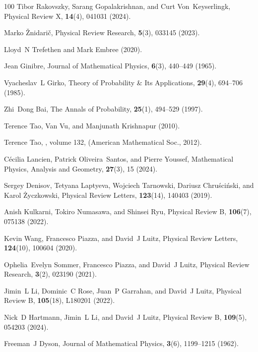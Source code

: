 \documentclass[preprint,pteplogo]{ptephy_v2}%
\numberwithin{equation}{section}
\theoremstyle{definition}
\begin{document}
\begin{thebibliography}{100}
Tibor Rakovszky, Sarang Gopalakrishnan, and Curt Von~Keyserlingk, Physical Review X, {\bf 14}(4), 041031 (2024).

Marko {\v{Z}}nidari{\v{c}}, Physical Review Research, {\bf 5}(3), 033145 (2023).

Lloyd~N Trefethen and Mark Embree (2020).

Jean Ginibre, Journal of Mathematical Physics, {\bf 6}(3), 440--449 (1965).

Vyacheslav~L Girko, Theory of Probability \& Its Applications, {\bf 29}(4), 694--706 (1985).

Zhi~Dong Bai, The Annals of Probability, {\bf 25}(1), 494--529 (1997).

Terence Tao, Van Vu, and Manjunath Krishnapur (2010).

Terence Tao,
, volume 132,
\newblock  (American Mathematical Soc., 2012).

C{\'e}cilia Lancien, Patrick Oliveira~Santos, and Pierre Youssef, Mathematical Physics, Analysis and Geometry, {\bf 27}(3), 15 (2024).

Sergey Denisov, Tetyana Laptyeva, Wojciech Tarnowski, Dariusz Chru{\'s}ci{\'n}ski, and Karol {\.Z}yczkowski, Physical Review Letters, {\bf 123}(14), 140403 (2019).

Anish Kulkarni, Tokiro Numasawa, and Shinsei Ryu, Physical Review B, {\bf 106}(7), 075138 (2022).

Kevin Wang, Francesco Piazza, and David~J Luitz, Physical Review Letters, {\bf 124}(10), 100604 (2020).

Ophelia~Evelyn Sommer, Francesco Piazza, and David~J Luitz, Physical Review Research, {\bf 3}(2), 023190 (2021).

Jimin~L Li, Dominic~C Rose, Juan~P Garrahan, and David~J Luitz, Physical Review B, {\bf 105}(18), L180201 (2022).

Nick~D Hartmann, Jimin~L Li, and David~J Luitz, Physical Review B, {\bf 109}(5), 054203 (2024).

Freeman~J Dyson, Journal of Mathematical Physics, {\bf 3}(6), 1199--1215 (1962).


\end{thebibliography}
\end{document}
